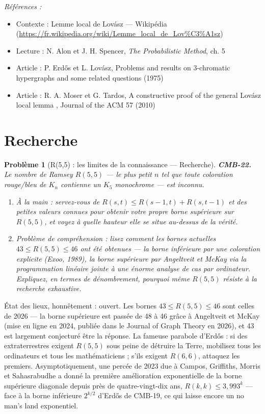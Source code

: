 \documentclass[11pt]{article}
\newtheorem{problem}{Problème}
\newenvironment{refs}{\par\small\noindent\emph{Références :}\begin{itemize}\setlength\itemsep{0pt}}{\end{itemize}\normalsize}
\begin{document}
\begin{refs}
\item Contexte : Lemme local de Lovász --- Wikipédia (\url{https://fr.wikipedia.org/wiki/Lemme_local_de_Lov%C3%A1sz})
\item Lecture : N. Alon et J. H. Spencer, \textit{The Probabilistic Method}, ch. 5
\item Article : P. Erd\H{o}s et L. Lovász, \og{} Problems and results on 3-chromatic hypergraphs and some related questions \fg{} (1975)
\item Article : R. A. Moser et G. Tardos, \og{} A constructive proof of the general Lovász local lemma \fg{}, Journal of the ACM 57 (2010)
\end{refs}

\bigskip


\section*{Recherche}

\begin{problem}[{R(5,5) : les limites de la connaissance --- Recherche}]
\textbf{CMB-22.} Le nombre de Ramsey $ R(5,5) $ --- le plus petit $ n $ tel que toute
coloration rouge/bleu de $ K_n $ contienne un $ K_5 $ monochrome --- est inconnu.
\begin{enumerate}
\item[(a)] À la main : servez-vous de $ R(s,t) \le R(s-1,t) + R(s,t-1) $ et des petites valeurs
connues pour obtenir votre propre borne supérieure sur $ R(5,5) $, et voyez à quelle hauteur
elle se situe au-dessus de la vérité.
\item[(b)] Problème de compréhension : lisez comment les bornes actuelles $ 43 \le R(5,5) \le 46 $ ont
été obtenues --- la borne inférieure par une coloration explicite (Exoo, 1989), la borne supérieure
par Angeltveit et McKay via la programmation linéaire jointe à une énorme analyse de cas par
ordinateur. Expliquez, en termes de dénombrement, pourquoi même $ R(5,5) $ résiste à la
recherche exhaustive.
\end{enumerate}

\end{problem}

\noindent État des lieux, honnêtement : ouvert. Les bornes $ 43 \le R(5,5) \le 46 $ sont
celles de 2026 --- la borne supérieure est passée de 48 à 46 grâce à Angeltveit et McKay (mise en
ligne en 2024, publiée dans le Journal of Graph Theory en 2026), et 43 est largement conjecturé
être la réponse. La fameuse parabole d'Erd\H{o}s : si des extraterrestres exigent $ R(5,5) $ sous
peine de détruire la Terre, mobilisez tous les ordinateurs et tous les mathématiciens ; s'ils
exigent $ R(6,6) $, attaquez les premiers. Asymptotiquement, une percée de 2023 due à Campos,
Griffiths, Morris et Sahasrabudhe a donné la première amélioration exponentielle de la borne
supérieure diagonale depuis près de quatre-vingt-dix ans, $ R(k,k) \le 3{,}993^k $ --- face à la
borne inférieure $ 2^{k/2} $ d'Erd\H{o}s de CMB-19, ce qui laisse encore un no man's land
exponentiel.
\end{document}
